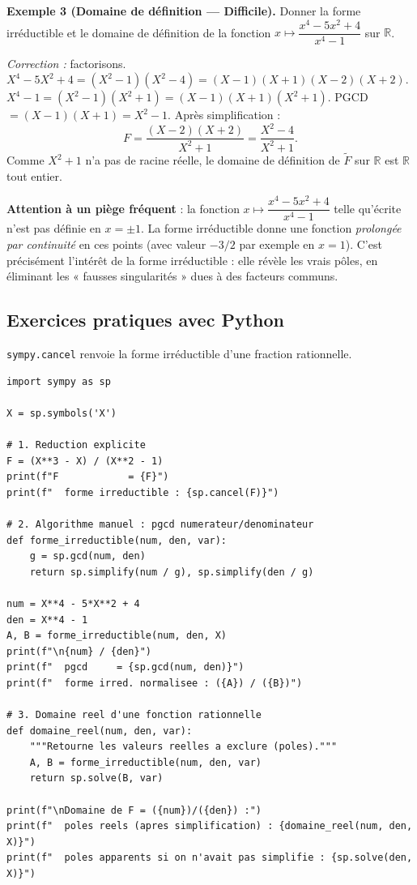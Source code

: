 \documentclass[12pt,a4paper]{report}
\theoremstyle{definition}
\theoremstyle{remark}
\begin{document}
\textbf{Exemple 3 (Domaine de définition --- Difficile).}
Donner la forme irréductible et le domaine de définition de la fonction $x \mapsto \dfrac{x^4 - 5x^2 + 4}{x^4 - 1}$ sur $\mathbb{R}$.

\textit{Correction :} factorisons.
$X^4 - 5X^2 + 4 = (X^2 - 1)(X^2 - 4) = (X - 1)(X + 1)(X - 2)(X + 2)$.
$X^4 - 1 = (X^2 - 1)(X^2 + 1) = (X - 1)(X + 1)(X^2 + 1)$.
PGCD $= (X - 1)(X + 1) = X^2 - 1$.
Après simplification :
\[ F = \frac{(X - 2)(X + 2)}{X^2 + 1} = \frac{X^2 - 4}{X^2 + 1}. \]
Comme $X^2 + 1$ n'a pas de racine réelle, le domaine de définition de $\widetilde{F}$ sur $\mathbb{R}$ est $\mathbb{R}$ tout entier.

\smallskip

\textbf{Attention à un piège fréquent} : la fonction $x \mapsto \dfrac{x^4 - 5x^2 + 4}{x^4 - 1}$ telle qu'écrite n'est pas définie en $x = \pm 1$. La forme irréductible donne une fonction \emph{prolongée par continuité} en ces points (avec valeur $-3/2$ par exemple en $x = 1$). C'est précisément l'intérêt de la forme irréductible : elle révèle les vrais pôles, en éliminant les « fausses singularités » dues à des facteurs communs.

\subsection{Exercices pratiques avec Python}
\texttt{sympy.cancel} renvoie la forme irréductible d'une fraction rationnelle.

\begin{lstlisting}
import sympy as sp

X = sp.symbols('X')

# 1. Reduction explicite
F = (X**3 - X) / (X**2 - 1)
print(f"F            = {F}")
print(f"  forme irreductible : {sp.cancel(F)}")

# 2. Algorithme manuel : pgcd numerateur/denominateur
def forme_irreductible(num, den, var):
    g = sp.gcd(num, den)
    return sp.simplify(num / g), sp.simplify(den / g)

num = X**4 - 5*X**2 + 4
den = X**4 - 1
A, B = forme_irreductible(num, den, X)
print(f"\n{num} / {den}")
print(f"  pgcd     = {sp.gcd(num, den)}")
print(f"  forme irred. normalisee : ({A}) / ({B})")

# 3. Domaine reel d'une fonction rationnelle
def domaine_reel(num, den, var):
    """Retourne les valeurs reelles a exclure (poles)."""
    A, B = forme_irreductible(num, den, var)
    return sp.solve(B, var)

print(f"\nDomaine de F = ({num})/({den}) :")
print(f"  poles reels (apres simplification) : {domaine_reel(num, den, X)}")
print(f"  poles apparents si on n'avait pas simplifie : {sp.solve(den, X)}")
\end{lstlisting}
\end{document}
